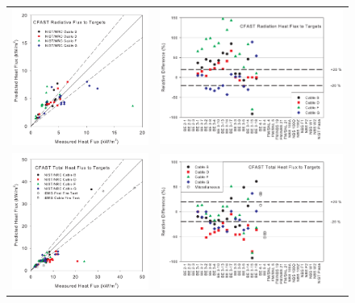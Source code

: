 \begin{figure}[p]
\begin{center}
\begin{tabular}{lr}
\includegraphics[width=2.6in]{FIGURES/ScatterPlots/Target_Rad} & \includegraphics[width=3.5in]{FIGURES/Relative_Diff/Target_Rad}  \\
\includegraphics[width=2.6in]{FIGURES/ScatterPlots/Target_Total} & \includegraphics[width=3.5in]{FIGURES/Relative_Diff/Target_Total}  \\

\end{tabular}
\end{center}
\end{figure}
